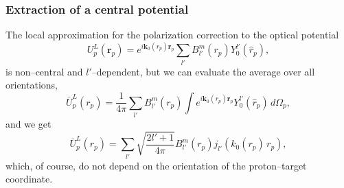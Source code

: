 \documentclass[a4paper,11pt]{article}
\begin{document}
  \subsubsection{Extraction of a central potential}
The local approximation for the polarization correction to the optical potential 
 \begin{equation}\label{eq58}
U^L_p(\mathbf r_p)=e^{i\mathbf k_0(r_p)\mathbf r_p}\sum_{l'} B^m_{l'}(r_p)Y_0^{l'}(\hat r_p),
 \end{equation}
is non--central and $l'$--dependent, but we can evaluate the average over all orientations,
 \begin{equation}\label{eq50}
\bar U^L_p(r_p)=\frac{1}{4\pi}\sum_{l'} B^m_{l'}(r_p)\int e^{i\mathbf k_0(r_p)\mathbf r_p}Y_0^{l'}(\hat r_p)\,d\Omega_p,
 \end{equation}
 and we get
 \begin{equation}\label{eq70}
 \bar U^L_p(r_p)=\sum_{l'}\sqrt{\frac{2l'+1}{4\pi}} B^m_{l'}(r_p)j_{l'}(k_0(r_p) \,r_p),
 \end{equation}
 which, of course, do not depend on the orientation of the proton--target coordinate.
\end{document}
